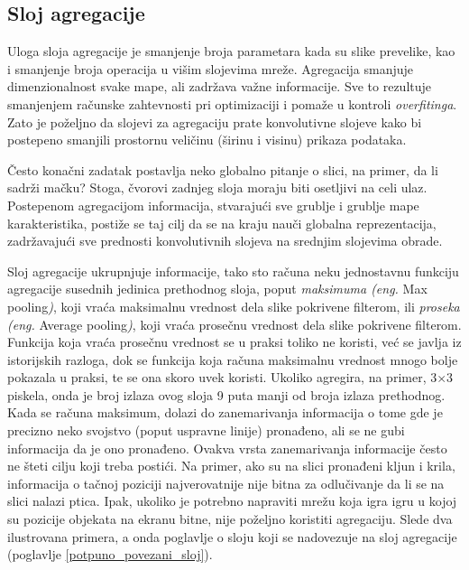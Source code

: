 \documentclass[a4paper]{article}
\begin{document}
\newpage


\subsection{Sloj agregacije}
\label{sloj_agregacije}

Uloga sloja agregacije je smanjenje broja parametara kada su slike prevelike, kao i smanjenje broja operacija u višim slojevima mreže. Agregacija smanjuje dimenzionalnost svake mape, ali zadržava važne informacije. Sve to rezultuje smanjenjem računske zahtevnosti pri optimizaciji i pomaže u kontroli \textit{overfitinga}. Zato je poželjno da slojevi za agregaciju prate konvolutivne slojeve kako bi postepeno smanjili prostornu veličinu (širinu i visinu) prikaza podataka.

Često konačni zadatak postavlja neko globalno pitanje o slici, na primer, da li sadrži mačku? Stoga, čvorovi zadnjeg sloja moraju biti osetljivi na celi ulaz. Postepenom agregacijom informacija, stvarajući sve grublje i grublje mape karakteristika, postiže se taj cilj da se na kraju nauči globalna reprezentacija, zadržavajući sve prednosti konvolutivnih slojeva na srednjim slojevima obrade.

Sloj agregacije ukrupnjuje informacije, tako sto računa neku jednostavnu funkciju agregacije susednih jedinica prethodnog sloja, poput \textit{maksimuma (eng.} Max pooling\textit{)}, koji vraća maksimalnu vrednost dela slike pokrivene filterom, ili \textit{proseka (eng.} Average pooling\textit{)}, koji vraća prosečnu vrednost dela slike pokrivene filterom. Funkcija koja vraća prosečnu vrednost se u praksi toliko ne koristi, već se javlja iz istorijskih razloga, dok se funkcija koja računa maksimalnu vrednost mnogo bolje pokazala u praksi, te se ona skoro uvek koristi. Ukoliko agregira, na primer, 3$\times$3 piskela, onda je broj izlaza ovog sloja 9 puta manji od broja izlaza prethodnog. Kada se računa maksimum, dolazi do zanemarivanja informacija o tome gde je precizno neko svojstvo (poput uspravne linije) pronađeno, ali se ne gubi informacija da je ono pronađeno. Ovakva vrsta zanemarivanja informacije često ne šteti cilju koji treba postići. Na primer, ako su na slici pronađeni kljun i krila, informacija o tačnoj poziciji najverovatnije nije bitna za odlučivanje da li se na slici nalazi ptica. Ipak, ukoliko je potrebno napraviti mrežu koja igra igru u kojoj su pozicije objekata na ekranu bitne, nije poželjno koristiti agregaciju. Slede dva ilustrovana primera, a onda poglavlje o sloju koji se nadovezuje na sloj agregacije (poglavlje \ref{potpuno_povezani_sloj}).
\end{document}
